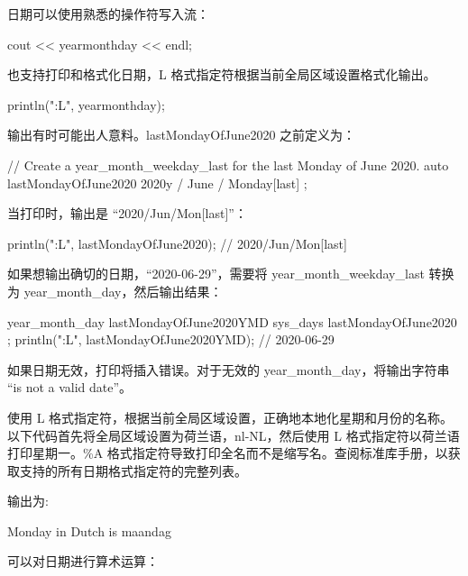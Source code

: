 日期可以使用熟悉的操作符写入流：

\begin{cpp}
cout << yearmonthday << endl;
\end{cpp}

也支持打印和格式化日期，L 格式指定符根据当前全局区域设置格式化输出。

\begin{cpp}
println("{:L}", yearmonthday);
\end{cpp}

输出有时可能出人意料。lastMondayOfJune2020 之前定义为：

\begin{cpp}
// Create a year_month_weekday_last for the last Monday of June 2020.
auto lastMondayOfJune2020 { 2020y / June / Monday[last] };
\end{cpp}

当打印时，输出是 “2020/Jun/Mon[last]”：

\begin{cpp}
println("{:L}", lastMondayOfJune2020); // 2020/Jun/Mon[last]
\end{cpp}

如果想输出确切的日期，“2020-06-29”，需要将 year\_month\_weekday\_last 转换为 year\_month\_day，然后输出结果：

\begin{cpp}
year_month_day lastMondayOfJune2020YMD { sys_days { lastMondayOfJune2020 } };
println("{:L}", lastMondayOfJune2020YMD); // 2020-06-29
\end{cpp}

如果日期无效，打印将插入错误。对于无效的 year\_month\_day，将输出字符串 “is not a valid date”。

使用 L 格式指定符，根据当前全局区域设置，正确地本地化星期和月份的名称。以下代码首先将全局区域设置为荷兰语，nl-NL，然后使用 L 格式指定符以荷兰语打印星期一。\%A 格式指定符导致打印全名而不是缩写名。查阅标准库手册，以获取支持的所有日期格式指定符的完整列表。


输出为:

\begin{shell}
Monday in Dutch is maandag
\end{shell}


可以对日期进行算术运算：

